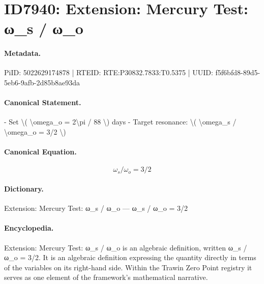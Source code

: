 \section*{ID7940: Extension: Mercury Test: ω\_s / ω\_o}
\paragraph{Metadata.}
PiID: 5022629174878 | RTEID: RTE:P30832.7833:T0.5375 | UUID: f5f6bfd8-89d5-5eb6-9afb-2d85b8ae93da

\paragraph{Canonical Statement.}
- Set \textbackslash{}( \textbackslash{}omega\_o = 2\textbackslash{}pi / 88 \textbackslash{}) days - Target resonance: \textbackslash{}( \textbackslash{}omega\_s / \textbackslash{}omega\_o = 3/2 \textbackslash{})

\paragraph{Canonical Equation.}
\[
\omega_s / \omega_o = 3/2
\]

\paragraph{Dictionary.}
Extension: Mercury Test: ω\_s / ω\_o — ω\_s / ω\_o = 3/2

\paragraph{Encyclopedia.}
Extension: Mercury Test: ω\_s / ω\_o is an algebraic definition, written ω\_s / ω\_o = 3/2. It is an algebraic definition expressing the quantity directly in terms of the variables on its right-hand side. Within the Trawin Zero Point registry it serves as one element of the framework's mathematical narrative.
